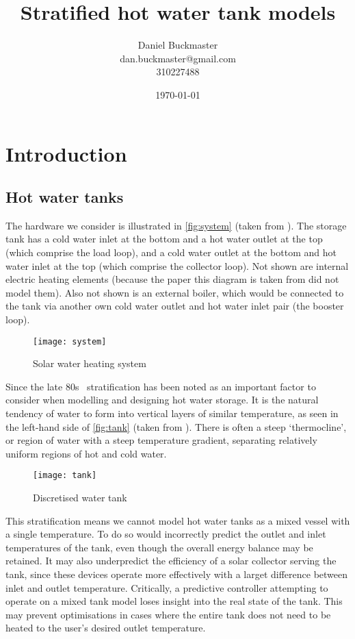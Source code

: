 \documentclass{article}
\title{Stratified hot water tank models}
\date{\today}
\author{Daniel Buckmaster \\ dan.buckmaster@gmail.com \\ 310227488}
\begin{document}
\maketitle

\section{Introduction}

\subsection{Hot water tanks}

The hardware we consider is illustrated in \autoref{fig:system} (taken from \textcite{Cristofari02}).
The storage tank has a cold water inlet at the bottom and a hot water outlet at the top (which comprise the load loop), and a cold water outlet at the bottom and hot water inlet at the top (which comprise the collector loop).
Not shown are internal electric heating elements (because the paper this diagram is taken from did not model them).
Also not shown is an external boiler, which would be connected to the tank via another own cold water outlet and hot water inlet pair (the booster loop).

\begin{figure}
   \centering
   \texttt{[image: system]}
   \caption{Solar water heating system}
   \label{fig:system}
\end{figure}

Since the late 80s~\cite{Hollands89} stratification has been noted as an important factor to consider when modelling and designing hot water storage.
It is the natural tendency of water to form into vertical layers of similar temperature, as seen in the left-hand side of \autoref{fig:tank} (taken from \textcite{Pfeiffer11}).
There is often a steep `thermocline', or region of water with a steep temperature gradient, separating relatively uniform regions of hot and cold water.

\begin{figure}
   \centering
   \texttt{[image: tank]}
   \caption{Discretised water tank}
   \label{fig:tank}
\end{figure}

This stratification means we cannot model hot water tanks as a mixed vessel with a single temperature.
To do so would incorrectly predict the outlet and inlet temperatures of the tank, even though the overall energy balance may be retained.
It may also underpredict the efficiency of a solar collector serving the tank, since these devices operate more effectively with a larget difference between inlet and outlet temperature.
Critically, a predictive controller attempting to operate on a mixed tank model loses insight into the real state of the tank.
This may prevent optimisations in cases where the entire tank does not need to be heated to the user's desired outlet temperature.
\end{document}
